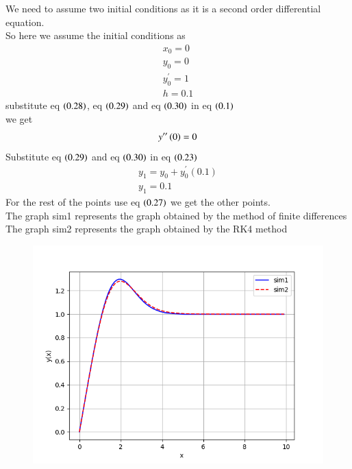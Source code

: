 \documentclass[journal]{IEEEtran}
\begin{document}
We need to assume two initial conditions as it is a second order differential equation. \\So here we assume the initial conditions as 
\begin{align}
    x_0=0\\y_0=0\\y^\prime_0=1\\h=0.1
\end{align}
substitute eq $\left(0.28\right)$, eq $\left(0.29\right)$ and eq $\left(0.30\right)$ in eq $\left(0.1\right)$\\ we get 
\begin{align}
    y^{\prime\prime}\left(0\right)=0
\end{align}
Substitute eq $\left(0.29\right)$ and eq $\left(0.30\right)$ in eq $\left(0.23\right)$
\begin{align}
    y_1=y_0+y^\prime_0(0.1)\\
    y_1=0.1
\end{align}
For the rest of the points use eq $\left(0.27\right)$ we get the other points.\\
The graph sim1 represents the graph obtained by the method of finite differences\\
The graph sim2 represents the graph obtained by the RK4 method
\begin{figure}[h!]
   \centering
   \includegraphics[width=\columnwidth]{figs/fig.png}
\end{figure}
\end{document}
